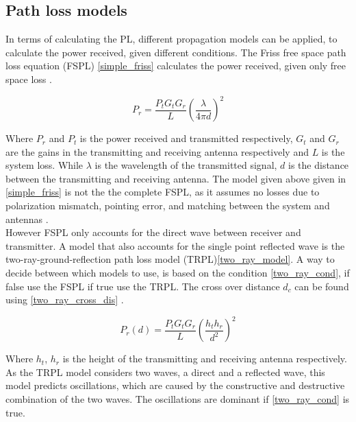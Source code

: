 \subsection{Path loss models}

In terms of calculating the PL, different propagation models can be applied, to calculate the power received, given different conditions. The Friss free space path loss equation (FSPL) \eqref{simple_friss} calculates the power received, given only free space loss \cite{Chong}.

\begin{equation}
P_r = \frac{P_t G_t G_r}{L} \left(\frac{\lambda}{4 \pi d}\right)^2
\label{simple_friss}
\end{equation}

Where $P_{r}$ and $P_{t}$ is the power received and transmitted respectively, $G_t$ and $G_r$ are the gains in the transmitting and receiving antenna respectively and $L$ is the system loss. While $\lambda$ is the wavelength of the transmitted signal, $d$ is the distance between the transmitting and receiving antenna. The model given above given in \eqref{simple_friss} is not the the complete FSPL, as it assumes no losses due to polarization mismatch, pointing error, and matching between the system and antennas \cite{full_friss}. \\

However FSPL only accounts for the direct wave between receiver and transmitter. A model that also accounts for the single point reflected wave is the two-ray-ground-reflection path loss model (TRPL)\eqref{two_ray_model}. A way to decide between which models to use, is based on the condition \eqref{two_ray_cond}, if false use the FSPL if true use the TRPL. The cross over distance $d_c$ can be found using \eqref{two_ray_cross_dis} \cite{two_ray}. 


\begin{equation}
P_r(d) = \frac{P_t G_t G_r }{L}\left(\frac{h_t h_r}{d^2}\right)^2
\label{two_ray_model}
\end{equation}

Where $h_t$, $h_r$ is the height of the transmitting and receiving antenna respectively. \\
As the TRPL model considers two waves, a direct and a reflected wave, this model predicts oscillations, which are caused by the constructive and destructive combination of the two waves. The oscillations are dominant if \eqref{two_ray_cond} is true\cite{two_ray}.


